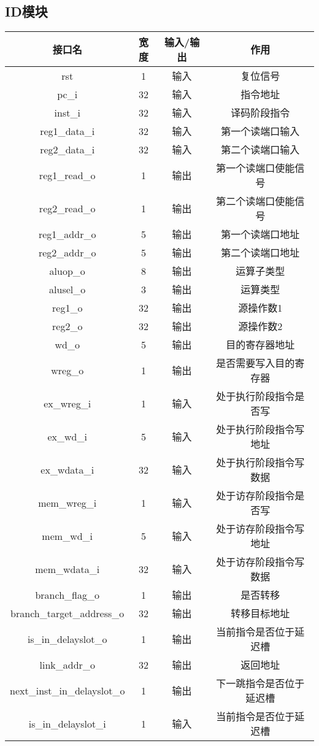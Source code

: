	\newpage
	\subsection{ID模块}
	\begin{table}[!hbp]
		\centering
		\begin{tabular}{|c|c|c|c|}
		\hline
		接口名&宽度&输入/输出&作用\\
		\hline
		rst &1& 输入& 复位信号\\
		\hline
		pc{\_}i& 32& 输入& 指令地址\\
		\hline
		inst{\_}i& 32& 输入& 译码阶段指令\\
		\hline
		reg1{\_}data{\_}i& 32& 输入& 第一个读端口输入\\
		\hline
		reg2{\_}data{\_}i& 32& 输入& 第二个读端口输入\\
		\hline
		reg1{\_}read{\_}o& 1& 输出& 第一个读端口使能信号\\
		\hline
		reg2{\_}read{\_}o& 1& 输出& 第二个读端口使能信号\\
		\hline
		reg1{\_}addr{\_}o& 5& 输出& 第一个读端口地址\\
		\hline
		reg2{\_}addr{\_}o& 5& 输出& 第二个读端口地址\\
		\hline
		aluop{\_}o& 8& 输出& 运算子类型\\
		\hline
		alusel{\_}o& 3& 输出& 运算类型\\
		\hline
		reg1{\_}o &32 &输出 &源操作数1\\
		\hline
		reg2{\_}o &32 &输出 &源操作数2\\
		\hline
		wd{\_}o& 5& 输出& 目的寄存器地址\\
		\hline
		wreg{\_}o& 1& 输出& 是否需要写入目的寄存器\\
		\hline
		ex{\_}wreg{\_}i& 1& 输入& 处于执行阶段指令是否写\\
		\hline
		ex{\_}wd{\_}i& 5& 输入& 处于执行阶段指令写地址\\
		\hline
		ex{\_}wdata{\_}i& 32& 输入& 处于执行阶段指令写数据\\
		\hline
		mem{\_}wreg{\_}i& 1& 输入& 处于访存阶段指令是否写\\
		\hline
		mem{\_}wd{\_}i& 5& 输入& 处于访存阶段指令写地址\\
		\hline
		mem{\_}wdata{\_}i& 32& 输入& 处于访存阶段指令写数据\\
		\hline
		branch{\_}flag{\_}o &1& 输出& 是否转移\\
		\hline
		branch{\_}target{\_}address{\_}o& 32& 输出& 转移目标地址\\
		\hline
		is{\_}in{\_}delayslot{\_}o &1& 输出& 当前指令是否位于延迟槽\\
		\hline
		link{\_}addr{\_}o &32 &输出& 返回地址\\
		\hline
		next{\_}inst{\_}in{\_}delayslot{\_}o &1 &输出& 下一跳指令是否位于延迟槽\\
		\hline
		is{\_}in{\_}delayslot{\_}i &1 &输入 &当前指令是否位于延迟槽\\
		\hline
		\end{tabular}
	\end{table}

